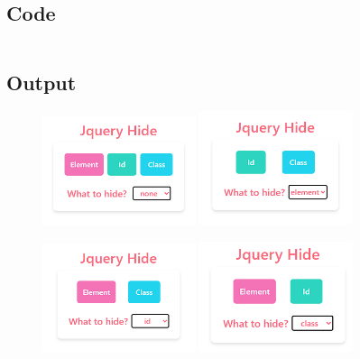 \documentclass{article}
\begin{document}
\subsection{Code}
\inputminted[frame=lines, breaklines, breakanywhere, numberblanklines=false]{html}{./prog_18/index.html}

\subsection{Output}
\begin{figure}[h!]
	\centering
	\includegraphics[width=0.4\textwidth]{./Assets/p1801.png}
	\includegraphics[width=0.4\textwidth]{./Assets/p1802.png}
\end{figure}
\begin{figure}[h!]
	\centering
	\includegraphics[width=0.4\textwidth]{./Assets/p1803.png}
	\includegraphics[width=0.4\textwidth]{./Assets/p1804.png}
\end{figure}
\newpage
\end{document}
